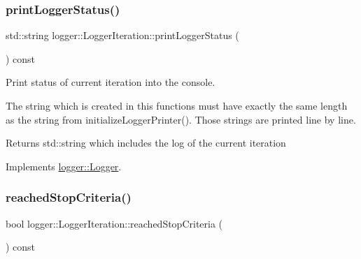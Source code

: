 \mbox{\label{classlogger_1_1_logger_iteration_ac6283092f495a6e8c5ab357ae84cb911}} 
\subsubsection{\texorpdfstring{print\+Logger\+Status()}{printLoggerStatus()}}
{\footnotesize\ttfamily std\+::string logger\+::\+Logger\+Iteration\+::print\+Logger\+Status (\begin{DoxyParamCaption}{ }\end{DoxyParamCaption}) const\hspace{0.3cm}{\ttfamily [virtual]}}



Print status of current iteration into the console. 

The string which is created in this functions must have exactly the same length as the string from {\ttfamily initialize\+Logger\+Printer()}. Those strings are printed line by line.

\begin{DoxyReturn}{Returns}
{\ttfamily std\+::string} which includes the log of the current iteration 
\end{DoxyReturn}


Implements \hyperlink{classlogger_1_1_logger_abad818a7e8053ca84cb267e883b5e377}{logger\+::\+Logger}.

\mbox{\label{classlogger_1_1_logger_iteration_af4cd1f0b87dcff8a88439f2ca6b07f1f}} 
\subsubsection{\texorpdfstring{reached\+Stop\+Criteria()}{reachedStopCriteria()}}
{\footnotesize\ttfamily bool logger\+::\+Logger\+Iteration\+::reached\+Stop\+Criteria (\begin{DoxyParamCaption}{ }\end{DoxyParamCaption}) const\hspace{0.3cm}{\ttfamily [virtual]}}




